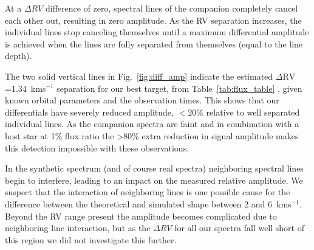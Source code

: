 At a \(\Delta RV\) difference of zero, spectral lines of the companion completely cancel each other out, resulting in zero amplitude. As the RV separation increases, the individual lines stop canceling themselves until a maximum differential amplitude is achieved when the lines are fully separated from themselves (equal to the line depth). 

The two solid vertical lines in Fig.~\ref{fig:diff_amp} indicate the estimated \(\Delta \textrm{RV}\)=1.34~kms\(^{-1}\) separation for our best target,  from Table~\ref{tab:flux_table} , given known orbital parameters and the observation times. This shows that our differentials have severely reduced amplitude, \(<20\%\) relative to well separated individual lines. As the companion spectra are faint and in combination with a host star at 1\% flux ratio the >80\% extra reduction in signal amplitude makes this detection impossible with these observations.

In the synthetic spectrum (and of course real spectra) neighboring spectral lines begin to interfere, leading to an impact on the measured relative amplitude. We suspect that the interaction of neighboring lines is one possible cause for the difference between the theoretical and simulated shape between 2 and 6~kms\(^{-1}\). Beyond the RV range present the amplitude becomes complicated due to neighboring line interaction, but as the \(\Delta RV\) for all our spectra fall well short of this region we did not investigate this further.

